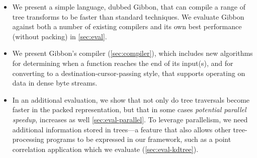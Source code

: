 \documentclass[a4paper,english]{lipics-v2016}
\newcommand{\treelang}{Gibbon\xspace} %
\begin{document}
\begin{itemize}
   
\item We present a simple language,
 dubbed \treelang, that can compile a range of tree transforms
 to be  faster than standard techniques.
 We evaluate Gibbon against both a number of existing compilers and
 its own best performance (without packing) in \cref{sec:eval}.

\item We present Gibbon's compiler (\cref{sec:compiler}), which includes new
  algorithms for determining when a function reaches the end of its input(s), and
  for converting to a destination-cursor-passing style, that supports
  operating on data in dense byte streams.

  
\item In an additional evaluation, we show that not only do tree traversals
  become faster in the packed representation, {but that in some cases {\em
      potential parallel speedup}, increases as well} \cref{sec:eval-parallel}.
  To leverage parallelism, we need additional information stored in trees---a
  feature that also allows other tree-processing programs to be expressed in our
  framework, such as a point correlation application which we evaluate (\cref{sec:eval-kdtree}).
  
\end{itemize}


\end{document}
